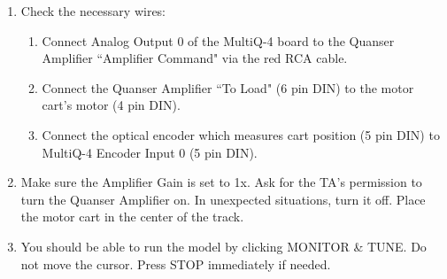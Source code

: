 \documentclass[11pt,letterpaper]{article}
\begin{document}
\begin{enumerate}
  \item Check the necessary wires:
    \begin{enumerate}
      \item Connect Analog Output 0 of the MultiQ-4 board to the Quanser Amplifier “Amplifier Command" via the red RCA cable.
      \item Connect the Quanser Amplifier “To Load" (6 pin DIN) to the motor cart's motor (4 pin DIN). 
      \item Connect the optical encoder which measures cart position (5 pin DIN) to MultiQ-4 Encoder Input 0 (5 pin DIN). 
    \end{enumerate}
  \item Make sure the Amplifier Gain is set to 1x. Ask for the TA’s permission to turn the Quanser Amplifier on. In unexpected situations, turn it off. Place the motor cart in the center of the track.
  \item You should be able to run the model by clicking MONITOR \& TUNE. Do not move the cursor. Press STOP immediately if needed.
\end{enumerate}
\end{document}
